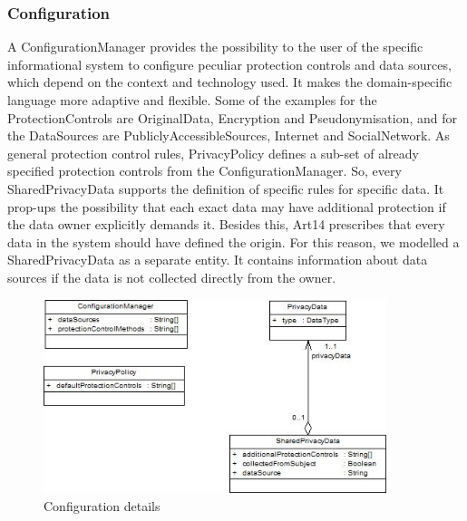 \documentclass[11pt,english]{article}
\begin{document}
\subsubsection{Configuration}
A ConfigurationManager provides the possibility to the user of the specific informational system to configure peculiar protection controls and data sources, 
which depend on the context and technology used. It makes the domain-specific language more adaptive and flexible. Some of the examples for the ProtectionControls are OriginalData, Encryption and Pseudonymisation, and for the DataSources are PubliclyAccessibleSources, Internet and SocialNetwork. As general protection control rules, PrivacyPolicy defines a sub-set of already specified protection controls from the ConfigurationManager. So, every SharedPrivacyData supports the definition of specific rules for specific data. It prop-ups the possibility that each exact data may have additional protection if the data owner explicitly demands it. Besides this, Art14 prescribes that every data in the system should have defined the origin. For this reason, we modelled a SharedPrivacyData as a separate entity. It contains information about data sources if the data is not collected directly from the owner.
\begin{figure}[H]
    \centering
    \includegraphics[width=10cm,scale=0.5]{images/configuration.jpg}
    \caption{Configuration details}
    \label{fig:configuration}
\end{figure}
\end{document}
